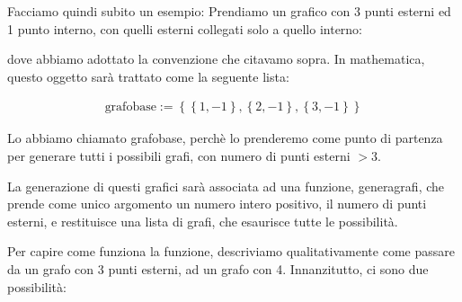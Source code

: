 \documentclass{report}
\begin{document}
Facciamo quindi subito un esempio: Prendiamo un grafico con 3 punti esterni ed 1 punto interno, con quelli esterni collegati solo a quello interno: 

\begin{center}
\end{center}

dove abbiamo adottato la convenzione che citavamo sopra. In mathematica, questo oggetto sarà trattato come la seguente lista: 

\begin{align}
    \text{grafobase} := \left\{ \left\{1, -1 \right\}, \left\{2, -1 \right\}, \left\{3, -1 \right\} \right\}
\end{align}

Lo abbiamo chiamato grafobase, perchè lo prenderemo come punto di partenza per generare tutti i possibili grafi, con numero di punti esterni \( >3\). 

La generazione di questi grafici sarà associata ad una funzione, generagrafi, che prende come unico argomento un numero intero positivo, il numero di punti esterni, e restituisce una lista di grafi, che esaurisce tutte le possibilità.   

Per capire come funziona la funzione, descriviamo qualitativamente come passare da un grafo con 3 punti esterni, ad un grafo con 4. Innanzitutto, ci sono due possibilità: 
\end{document}

